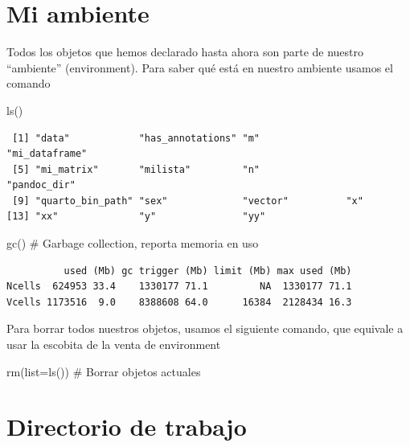 \documentclass[
  letterpaper,
  DIV=11,
  numbers=noendperiod]{scrreprt}
\newenvironment{Shaded}{\begin{snugshade}}{\end{snugshade}}
\newcommand{\AttributeTok}[1]{\textcolor[rgb]{0.40,0.45,0.13}{#1}}
\newcommand{\CommentTok}[1]{\textcolor[rgb]{0.37,0.37,0.37}{#1}}
\newcommand{\FunctionTok}[1]{\textcolor[rgb]{0.28,0.35,0.67}{#1}}
\newcommand{\NormalTok}[1]{\textcolor[rgb]{0.00,0.23,0.31}{#1}}
\begin{document}
\hypertarget{mi-ambiente}{%
\section{Mi ambiente}\label{mi-ambiente}}

Todos los objetos que hemos declarado hasta ahora son parte de nuestro
``ambiente'' (environment). Para saber qué está en nuestro ambiente
usamos el comando

\begin{Shaded}
\begin{Highlighting}[]
\FunctionTok{ls}\NormalTok{()}
\end{Highlighting}
\end{Shaded}

\begin{verbatim}
 [1] "data"            "has_annotations" "m"               "mi_dataframe"   
 [5] "mi_matrix"       "milista"         "n"               "pandoc_dir"     
 [9] "quarto_bin_path" "sex"             "vector"          "x"              
[13] "xx"              "y"               "yy"             
\end{verbatim}

\begin{Shaded}
\begin{Highlighting}[]
\FunctionTok{gc}\NormalTok{()           }\CommentTok{\# Garbage collection, reporta memoria en uso}
\end{Highlighting}
\end{Shaded}

\begin{verbatim}
          used (Mb) gc trigger (Mb) limit (Mb) max used (Mb)
Ncells  624953 33.4    1330177 71.1         NA  1330177 71.1
Vcells 1173516  9.0    8388608 64.0      16384  2128434 16.3
\end{verbatim}

Para borrar todos nuestros objetos, usamos el siguiente comando, que
equivale a usar la escobita de la venta de environment

\begin{Shaded}
\begin{Highlighting}[]
\FunctionTok{rm}\NormalTok{(}\AttributeTok{list=}\FunctionTok{ls}\NormalTok{())  }\CommentTok{\# Borrar objetos actuales}
\end{Highlighting}
\end{Shaded}

\hypertarget{directorio-de-trabajo}{%
\section{Directorio de trabajo}\label{directorio-de-trabajo}}
\end{document}

